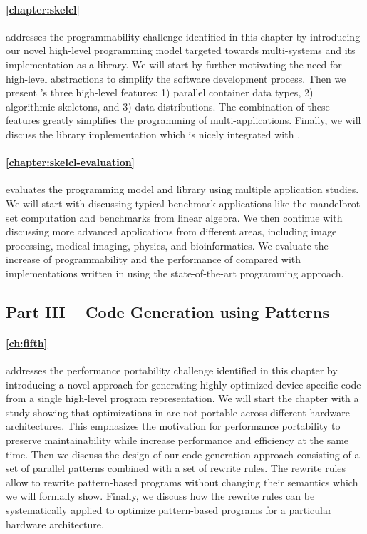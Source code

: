 \paragraph{\autoref{chapter:skelcl}} addresses the programmability challenge identified in this chapter by introducing our novel \SkelCL high-level programming model targeted towards multi-\GPU systems and its implementation as a \Cpp library.
We will start by further motivating the need for high-level abstractions to simplify the software development process.
Then we present \SkelCL's three high-level features:
1) parallel container data types, 2) algorithmic skeletons, and 3) data distributions.
The combination of these features greatly simplifies the programming of multi-\GPU applications.
Finally, we will discuss the \SkelCL library implementation which is nicely integrated with \Cpp.

\paragraph{\autoref{chapter:skelcl-evaluation}} evaluates the \SkelCL programming model and library using multiple application studies.
We will start with discussing typical benchmark applications like the mandelbrot set computation and benchmarks from linear algebra.
We then continue with discussing more advanced applications from different areas, including image processing, medical imaging, physics, and bioinformatics.
We evaluate the increase of programmability and the performance of \SkelCL compared with implementations written in using the state-of-the-art \OpenCL programming approach.


\subsection*{Part III -- Code Generation using Patterns}

\paragraph{\autoref{ch:fifth}} addresses the performance portability challenge identified in this chapter by introducing a novel approach for generating highly optimized device-specific code from a single high-level program representation.
We will start the chapter with a study showing that optimizations in \OpenCL are not portable across different hardware architectures.
This emphasizes the motivation for performance portability to preserve maintainability while increase performance and efficiency at the same time.
Then we discuss the design of our code generation approach consisting of a set of parallel patterns combined with a set of rewrite rules.
The rewrite rules allow to rewrite pattern-based programs without changing their semantics which we will formally show.
Finally, we discuss how the rewrite rules can be systematically applied to optimize pattern-based programs for a particular hardware architecture.

